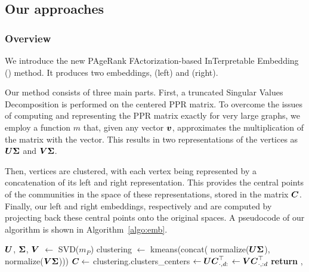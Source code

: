 
\subsection{Our approaches}\label{sec:approach}
\subsubsection{Overview} \label{subsec:overview}
We introduce the new PAgeRank FActorization-based InTerpretable Embedding (\parfaite{}) method. It produces two embeddings, \newembLeft{} (left) and \newembRight{} (right).

Our method consists of three main parts. First, a truncated Singular Values Decomposition is performed on the centered PPR matrix. To overcome the issues of computing and representing the PPR matrix exactly for very large graphs, we employ a function $m$ that, given any vector $\boldsymbol{v}$, approximates the multiplication of the matrix with the vector. This results in two representations of the vertices as $\boldsymbol{U}\boldsymbol{\Sigma}$ and $\boldsymbol{V}\boldsymbol{\Sigma}$.

Then, vertices are clustered, with each vertex being represented by a concatenation of its left and right representation. This provides the central points of the communities in the space of these representations, stored in the matrix $\boldsymbol{C}$. Finally, our left and right embeddings, respectively \newembLeft{} and \newembRight{} are computed by projecting back these central points onto the original spaces. A pseudocode of our algorithm is shown in Algorithm~\ref{algo:emb}. 

\begin{algorithm}
    \caption{\parfaite{}}\label{algo:emb}
    \begin{algorithmic}[1]
    \State $\boldsymbol{U}$, $\boldsymbol{\Sigma}$, $\boldsymbol{V}$ $\gets$ SVD($m_P$)
    \State clustering $\gets$ kmeans(concat( normalize($\boldsymbol{U}\boldsymbol{\Sigma}$), normalize($\boldsymbol{V}\boldsymbol{\Sigma}$)))
    \State $\boldsymbol{C} \gets$ clustering.clusters\_centers
    \State \newembLeft{} $ \gets \boldsymbol{U}\boldsymbol{C}_{\cdot, d:}^\top$
    \State\newembRight{} $ \gets \boldsymbol{V}\boldsymbol{C}_{\cdot, :d}^\top$
    \State \textbf{return} \newembLeft{}, \newembRight{}
    \EndProcedure
    \end{algorithmic}
\end{algorithm}

